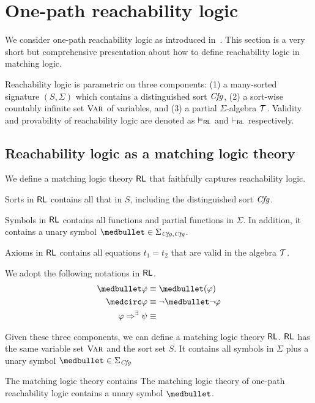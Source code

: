 \section{One-path reachability logic}

We consider one-path reachability logic
as introduced in~\cite{SPY+2016}.
This section is a very short but comprehensive presentation
about how to define reachability logic in matching logic.

Reachability logic is parametric on three components:
(1) a many-sorted signature $(S,\Sigma)$ which contains a distinguished sort
$\mathit{Cfg}$,
(2) a sort-wise countably infinite set $\textsc{Var}$ of variables,
and (3) a partial $\Sigma$-algebra $\mathcal{T}$.
Validity and provability of reachability logic are denoted as
$\vDash_{\mathsf{RL}}$ and $\vdash_{\mathsf{RL}}$ respectively.

\subsection{Reachability logic as a matching logic theory}

We define a matching logic theory $\mathsf{RL}$ that faithfully captures
reachability logic.

Sorts in $\mathsf{RL}$ contains all that in $S$, including the distinguished sort
$\mathit{Cfg}$.

Symbols in $\mathsf{RL}$ contains all functions and partial functions in $\Sigma$.
In addition, it contains a unary symbol $\snext \in \Sigma_{\Cfg, \Cfg}$.

Axioms in $\mathsf{RL}$ contains all equations $t_1 = t_2$ that are valid in
the algebra $\mathcal{T}$.

\begin{notation}
We adopt the following notations in $\mathsf{RL}$.
\begin{align*}
\snext \varphi &\equiv \snext(\varphi) \\
\wnext \varphi &\equiv \neg \snext \neg \varphi \\
\
\varphi \Toonepath \psi &\equiv 
\end{align*}
\end{notation}

Given these three components, we can define
a matching logic theory $\mathsf{RL}$.
$\mathsf{RL}$ has the same variable set $\textsc{Var}$ and the sort set $S$.
It contains all symbols in $\Sigma$ plus a unary symbol 
$\snext \in \Sigma_{\Cfg}$

The matching logic theory contains
The matching logic theory of one-path reachability logic contains
a unary symbol $\snext$. 